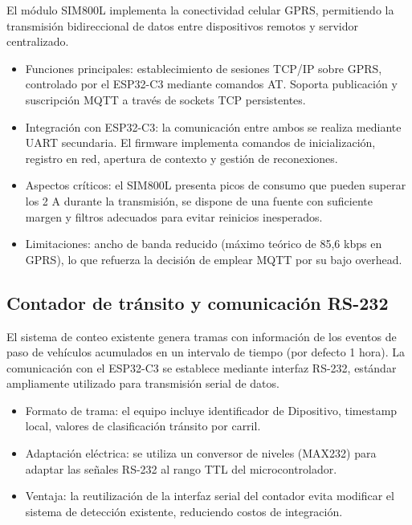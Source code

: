 El módulo SIM800L implementa la conectividad celular GPRS, permitiendo la transmisión bidireccional de datos entre dispositivos remotos y servidor centralizado.


\begin{itemize}

\item Funciones principales: establecimiento de sesiones TCP/IP sobre GPRS, controlado por el ESP32-C3 mediante comandos AT. Soporta publicación y suscripción MQTT a través de sockets TCP persistentes.

\item Integración con ESP32-C3: la comunicación entre ambos se realiza mediante UART secundaria. El firmware implementa comandos de inicialización, registro en red, apertura de contexto y gestión de reconexiones.

\item Aspectos críticos: el SIM800L presenta picos de consumo que pueden superar los 2 A durante la transmisión, se  dispone de una fuente con suficiente margen y filtros adecuados para evitar reinicios inesperados.

\item Limitaciones: ancho de banda reducido (máximo teórico de 85,6 kbps en GPRS), lo que refuerza la decisión de emplear MQTT por su bajo overhead.

\end{itemize}


\subsection{Contador de tránsito y comunicación RS-232}

El sistema de conteo existente genera tramas con información de los eventos de paso de vehículos acumulados en un intervalo de tiempo (por defecto 1 hora). La comunicación con el ESP32-C3 se establece mediante interfaz RS-232, estándar ampliamente utilizado para transmisión serial de datos.

\begin{itemize}
\item Formato de trama:  el equipo incluye identificador de Dipositivo, timestamp local, valores de clasificación tránsito por carril.

\item Adaptación eléctrica: se utiliza un conversor de niveles (MAX232) para adaptar las señales RS-232 al rango TTL del microcontrolador.

\item Ventaja: la reutilización de la interfaz serial del contador evita modificar el sistema de detección existente, reduciendo costos de integración.


\end{itemize}


